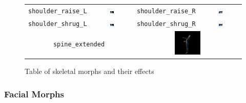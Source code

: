 \documentclass[../../main.tex]{subfiles}
\begin{document}
{\begin{figure}
\begin{tabular}{|c|c|c|c|}
        \texttt{shoulder\_raise\_L} & \includegraphics[width=0.1\textwidth]{chapters/avatar_creation_pose_synthesis/images/morph_renders/shoulder_raise_L_morph.png} &
        \texttt{shoulder\_raise\_R} & \includegraphics[width=0.1\textwidth]{chapters/avatar_creation_pose_synthesis/images/morph_renders/shoulder_raise_R_morph.png} \\

        \texttt{shoulder\_shrug\_L} & \includegraphics[width=0.1\textwidth]{chapters/avatar_creation_pose_synthesis/images/morph_renders/shoulder_shrug_L_morph.png} &
        \texttt{shoulder\_shrug\_R} & \includegraphics[width=0.1\textwidth]{chapters/avatar_creation_pose_synthesis/images/morph_renders/shoulder_shrug_R_morph.png} \\

        \hline
        \multicolumn{2}{|c|}{\texttt{spine\_extended}} &
        \multicolumn{2}{c|}{\centering\includegraphics[width=0.25\textwidth]{chapters/avatar_creation_pose_synthesis/images/morph_renders/spine_extended_morph.png}} \\
        \hline
    \end{tabular}
    \caption{Table of skeletal morphs and their effects}
    \label{fig:skeletal_morphs}
\end{figure}


\subsubsection{Facial Morphs}
\label{ch:avatar_creation_pose_synthesis:proc_rig_signing_avatars:morph_constraints:facial_morphs}

}
\end{document}
